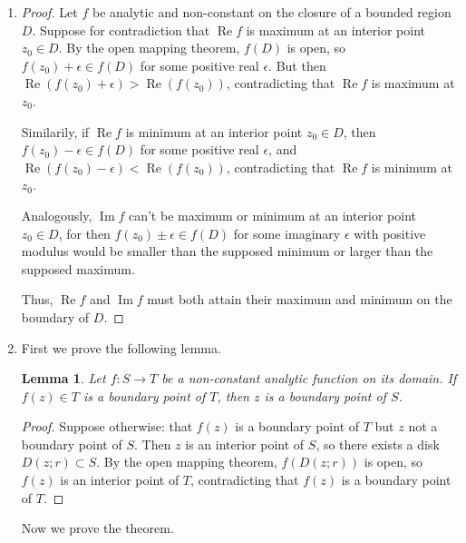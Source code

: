 \documentclass[11pt, letterpaper]{article}
\newtheorem{lemma}{Lemma}
\begin{document}
\thispagestyle{firststyle}


\begin{enumerate}
  \item \begin{proof}
    Let $f$ be analytic and non-constant on the closure of a bounded region $D$. Suppose for contradiction that $\operatorname{Re} f$ is maximum at an interior point $z_0 \in D$. By the open mapping theorem, $f(D)$ is open, so $f(z_0) + \epsilon \in f(D)$ for some positive real $\epsilon$. But then $\operatorname{Re}(f(z_0) + \epsilon) > \operatorname{Re}(f(z_0))$, contradicting that $\operatorname{Re} f$ is maximum at $z_0$.
    
    Similarily, if $\operatorname{Re} f$ is minimum at an interior point $z_0 \in D$, then $f(z_0) - \epsilon \in f(D)$ for some positive real $\epsilon$, and $\operatorname{Re}(f(z_0) - \epsilon) < \operatorname{Re}(f(z_0))$, contradicting that $\operatorname{Re} f$ is minimum at $z_0$.

    Analogously, $\operatorname{Im} f$ can't be maximum or minimum at an interior point $z_0 \in D$, for then $f(z_0) \pm \epsilon \in f(D)$ for some imaginary $\epsilon$ with positive modulus would be smaller than the supposed minimum or larger than the supposed maximum.

    Thus, $\operatorname{Re} f$ and $\operatorname{Im} f$ must both attain their maximum and minimum on the boundary of $D$.
  \end{proof}

  \item First we prove the following lemma.
  
  \begin{lemma}
    Let $f: S \to T$ be a non-constant analytic function on its domain. If $f(z) \in T$ is a boundary point of $T$, then $z$ is a boundary point of $S$.
  \end{lemma}
  \begin{proof}
    Suppose otherwise: that $f(z)$ is a boundary point of $T$ but $z$ not a boundary point of $S$. Then $z$ is an interior point of $S$, so there exists a disk $D(z; r) \subset S$. By the open mapping theorem, $f(D(z; r))$ is open, so $f(z)$ is an interior point of $T$, contradicting that $f(z)$ is a boundary point of $T$.
  \end{proof}
  
  Now we prove the theorem.


\end{enumerate}
\end{document}
